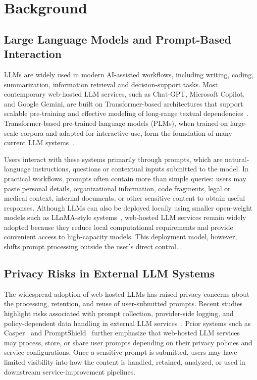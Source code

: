 \documentclass[conference]{IEEEtran}
\begin{document}
\section{Background}
\label{sec:background}

\subsection{Large Language Models and Prompt-Based Interaction}

LLMs are widely used in modern AI-assisted workflows, including writing, coding, summarization, information retrieval and decision-support tasks. Most contemporary web-hosted LLM services, such as Chat-GPT, Microsoft Copilot, and Google Gemini, are built on Transformer-based architectures that support scalable pre-training and effective modeling of long-range textual dependencies~\cite{courseraTransformersConvolutional,liu2025understanding}. Transformer-based pre-trained language models (PLMs), when trained on large-scale corpora and adapted for interactive use, form the foundation of many current LLM systems~\cite{zhong2023chatradio}.

Users interact with these systems primarily through prompts, which are natural-language instructions, questions or contextual inputs submitted to the model. In practical workflows, prompts often contain more than simple queries: users may paste personal details, organizational information, code fragments, legal or medical context, internal documents, or other sensitive content to obtain useful responses. Although LLMs can also be deployed locally using smaller open-weight models such as LLaMA-style systems~\cite{Llama2023}, web-hosted LLM services remain widely adopted because they reduce local computational requirements and provide convenient access to high-capacity models. This deployment model, however, shifts prompt processing outside the user's direct control.

\subsection{Privacy Risks in External LLM Systems}

The widespread adoption of web-hosted LLMs has raised privacy concerns about the processing, retention, and reuse of user-submitted prompts. Recent studies highlight risks associated with prompt collection, provider-side logging, and policy-dependent data handling in external LLM services~\cite{li2025security, de2025lifecycle}. Prior systems such as Casper~\cite{Casper2024} and PromptShield~\cite{kelecspromptshield} further emphasize that web-hosted LLM services may process, store, or share user prompts depending on their privacy policies and service configurations. Once a sensitive prompt is submitted, users may have limited visibility into how the content is handled, retained, analyzed, or used in downstream service-improvement pipelines.
\end{document}
